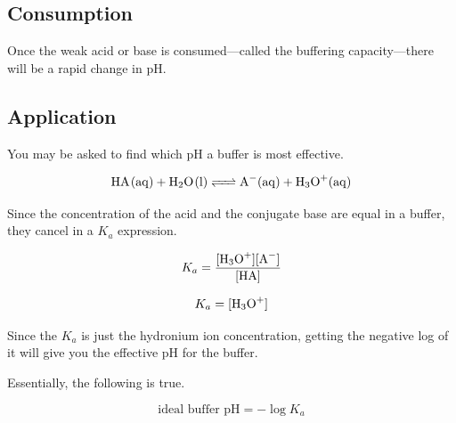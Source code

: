 \documentclass[a4paper,12pt]{article}
\begin{document}
\subsection{Consumption}
Once the weak acid or base is consumed---called the buffering capacity---there will be a rapid change in pH.

\subsection{Application}
You may be asked to find which pH a buffer is most effective.

$$\ce{HA(aq) + H2O(l) <=> A-(aq) + H3O+(aq)}$$

Since the concentration of the acid and the conjugate base are equal in a buffer, they cancel in a $K_a$ expression.

$$K_a = \frac{[\ce{H3O+}][\ce{A-}]}{[\ce{HA}]}$$

$$K_a = [\ce{H3O+}]$$

Since the $K_a$ is just the hydronium ion concentration, getting the negative log of it will give you the effective pH for the buffer.

Essentially, the following is true.

$$\textrm{ideal buffer pH} = -\log{K_a}$$
\end{document}
